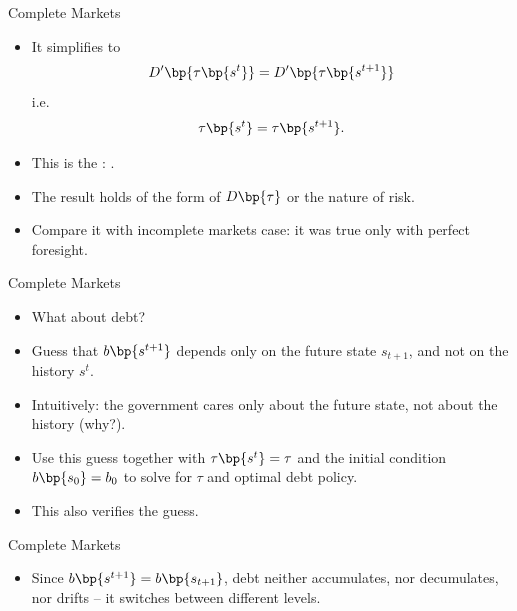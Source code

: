 \documentclass[11pt,xcolor={dvipsnames},hyperref={pdftex,pdfpagemode=UseNone,hidelinks,pdfdisplaydoctitle=true},usepdftitle=false]{beamer}
\begin{document}
    \begin{frame}{Complete Markets}
        \begin{itemize}
        \item It simplifies to              
        \begin{align*}
                D' \bp{\tau \bp{s^t}} =   D' \bp{\tau \bp{s^{t+1}}}
        \end{align*}
        i.e.
        \begin{align*}  
            \tau \bp{s^t} =   \tau \bp{s^{t+1}}.
        \end{align*}
        \item This is the : .
        \item The result holds  of the form of $D\bp{\tau}$ or the nature of risk.
        \item Compare it with incomplete markets case: it was true only with perfect foresight.
        \end{itemize}
        \end{frame}

        \begin{frame}{Complete Markets}
            \begin{itemize}
            \item What about debt?          
            \item Guess that $b\bp{s^{t+1}}$ depends only on the future state $s_{t+1}$, and not on the history $s^t$.
            \item Intuitively: the government cares only about the future state, not about the history (why?).
            \item Use this guess together with $\tau \bp{s^t} =   \tau$ and the initial condition $b\bp{s_0} = b_0$ to solve for $\tau$ and optimal debt policy.
            \item This also verifies the guess.
        \end{itemize}
            \end{frame}

        \begin{frame}{Complete Markets}
            \begin{itemize}
            \item Since $b\bp{s^{t+1}}=b\bp{s_{t+1}}$, debt neither accumulates, nor decumulates, nor drifts -- it switches between different levels.
            \end{itemize}
            \end{frame}
\end{document}
